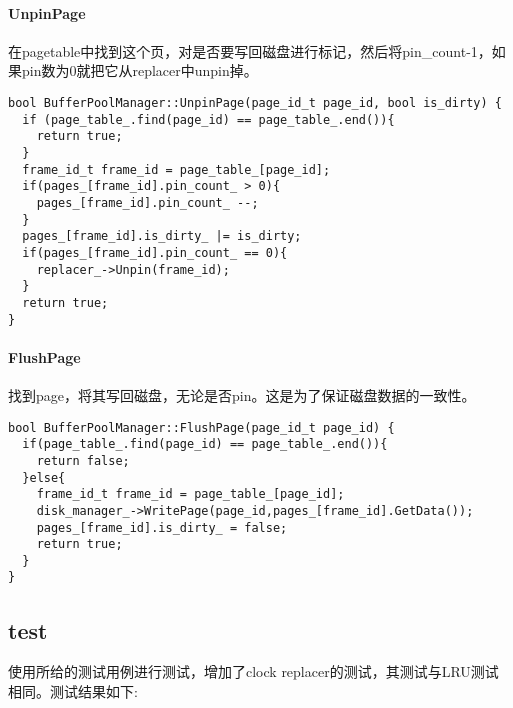 \documentclass[12pt,hyperref,a4paper,UTF8]{ctexart}
\begin{document}
\paragraph{UnpinPage}
在pagetable中找到这个页，对是否要写回磁盘进行标记，然后将pin\_count-1，如果pin数为0就把它从replacer中unpin掉。

\begin{verbatim}
bool BufferPoolManager::UnpinPage(page_id_t page_id, bool is_dirty) {
  if (page_table_.find(page_id) == page_table_.end()){
    return true;
  }
  frame_id_t frame_id = page_table_[page_id];
  if(pages_[frame_id].pin_count_ > 0){
    pages_[frame_id].pin_count_ --;
  }
  pages_[frame_id].is_dirty_ |= is_dirty;
  if(pages_[frame_id].pin_count_ == 0){
    replacer_->Unpin(frame_id);
  }
  return true;
}
\end{verbatim}

\paragraph{FlushPage}
找到page，将其写回磁盘，无论是否pin。这是为了保证磁盘数据的一致性。
\begin{verbatim}
bool BufferPoolManager::FlushPage(page_id_t page_id) {
  if(page_table_.find(page_id) == page_table_.end()){
    return false;
  }else{
    frame_id_t frame_id = page_table_[page_id];
    disk_manager_->WritePage(page_id,pages_[frame_id].GetData());
    pages_[frame_id].is_dirty_ = false;
    return true;
  }
}
\end{verbatim}

\subsection{test}

使用所给的测试用例进行测试，增加了clock replacer的测试，其测试与LRU测试相同。测试结果如下:
\end{document}
